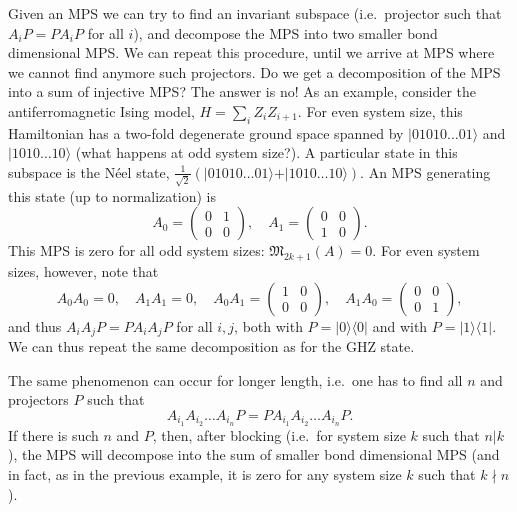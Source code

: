 \documentclass{article}
\newcommand{\ket}[1]{\vert #1 \rangle}
\newcommand{\bra}[1]{\langle #1 \vert}
\begin{document}
Given an MPS we can try to find an invariant subspace (i.e.\ projector such that $A_i P = PA_iP$ for all $i$), and decompose the MPS into two smaller bond dimensional MPS. We can repeat this procedure, until we arrive at MPS where we cannot find anymore such projectors. Do we get a decomposition of the MPS into a sum of injective MPS? The answer is no!  As an example, consider the antiferromagnetic Ising model, $H = \sum_i Z_i Z_{i+1}$. For even system size, this Hamiltonian has a two-fold degenerate ground space spanned by $\ket{01010\dots 01}$ and $\ket{1010 \dots 10}$ (what happens at odd system size?). A particular state in this subspace is the Néel state, $\tfrac{1}{\sqrt{2}}(\ket{01010\dots 01}+\ket{1010 \dots 10})$. An MPS generating this state (up to normalization) is 
\begin{equation*}
  A_0 = \left(\begin{matrix}
    0 & 1 \\ 0 & 0 
  \end{matrix}\right), \quad 
  A_1 = \left(\begin{matrix}
    0 & 0 \\ 1 & 0 
  \end{matrix}\right).
\end{equation*}
This MPS is zero for all odd system sizes: $\mathfrak{M}_{2k+1}(A) = 0$.  For even system sizes, however, note that
\begin{equation*}
  A_0 A_0 = 0, \quad 
  A_1 A_1 = 0, \quad 
  A_0 A_1 = \left(\begin{matrix}
    1 & 0 \\ 0 & 0 
  \end{matrix}\right), \quad 
  A_1 A_0 = \left(\begin{matrix}
    0 & 0 \\ 0 & 1 
  \end{matrix}\right),
\end{equation*}
and thus $A_i A_jP = P A_i A_j P$ for all $i,j$, both with $P = \ket{0}\bra{0}$ and with $P = \ket{1}\bra{1}$. We can thus repeat the same decomposition as for the GHZ state.

The same phenomenon can occur for longer length, i.e.\ one has to find all $n$ and projectors $P$ such that
\begin{equation}\label{eq:invariant_projector_n}
  A_{i_1} A_{i_2} \dots A_{i_n} P = P  A_{i_1} A_{i_2} \dots A_{i_n} P. 
\end{equation}
If there is such $n$ and $P$, then, after blocking (i.e.\ for system size $k$ such that $n|k$), the MPS will decompose into the sum of smaller bond dimensional MPS (and in fact, as in the previous example, it is zero for any system size $k$ such that $k\nmid n$). 
\end{document}
